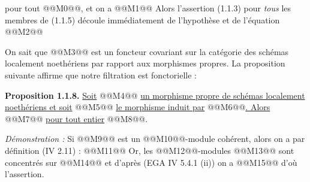 
pour tout @@M0@@, et on a
@@M1@@
Alors l'assertion (1.1.3) pour \emph{tous} les membres de (1.1.5) découle immédiatement de l'hypothèse et de l'équation
@@M2@@

On sait que @@M3@@ est un foncteur covariant sur la catégorie des schémas localement noethériens par rapport aux morphismes propres. La proposition suivante affirme que notre filtration est fonctorielle :

\textbf{Proposition 1.1.8.} \uline{Soit} @@M4@@ \uline{un morphisme propre de schémas localement noethériens et soit}
@@M5@@
\uline{le morphisme induit par} @@M6@@\uline{. Alors}
@@M7@@
\uline{pour tout entier} @@M8@@.

\emph{Démonstration :} Si @@M9@@ est un @@M10@@-module cohérent, alors on a par définition (IV 2.11) :
@@M11@@
Or, les @@M12@@-modules @@M13@@ sont concentrés sur @@M14@@ et d'après (EGA IV 5.4.1 (ii)) on a
@@M15@@
d'où l'assertion.

